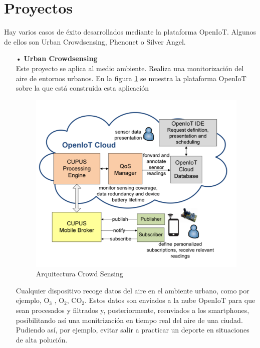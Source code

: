 \documentclass[12pt, twoside]{book}
\begin{document}
\section{Proyectos}
Hay varios casos de éxito desarrollados mediante la plataforma OpenIoT. Algunos de ellos son Urban Crowdsensing, Phenonet o Silver Angel.
\begin{itemize}
\item[•]\textbf{Urban Crowdsensing}\\
Este proyecto se aplica al medio ambiente. Realiza una monitorización del aire de entornos urbanos. En la figura \ref{L307} se muestra la plataforma OpenIoT sobre la que está construida esta aplicación
\begin{figure}[H]
\centering
\includegraphics[scale=0.4]{images/crowd_sensing}
\caption{Arquitectura Crowd Sensing}\label{L307}
\end{figure} 

Cualquier dispositivo recoge datos del aire en el ambiente urbano, como por ejemplo, O$_{3}$ , O$_{2}$, CO$_{2}$. Estos datos son enviados a la nube OpenIoT para que sean procesados y filtrados y, posteriormente, reenviados a los smartphones, posibilitando así una monitrización en tiempo real del aire de una ciudad. Pudiendo así, por ejemplo, evitar salir a practicar un deporte en situaciones de alta polución.



\end{itemize}
\end{document}
